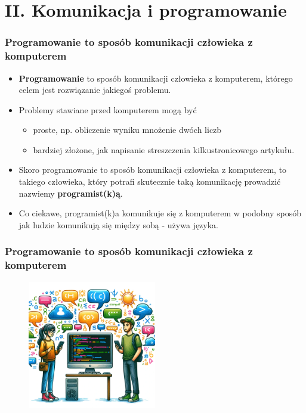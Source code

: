 \documentclass{beamer}
\begin{document}
\section{II. Komunikacja i programowanie}

\begin{frame}[fragile]
\frametitle{Programowanie to sposób komunikacji człowieka z komputerem}
 \begin{itemize}
\item \textbf{Programowanie} to sposób komunikacji człowieka z komputerem, którego celem jest rozwiązanie jakiegoś problemu.
\item Problemy stawiane przed komputerem mogą być 
	\begin{itemize}
	\item proste, np. obliczenie wyniku mnożenie dwóch liczb
	\item bardziej złożone, jak napisanie streszczenia kilkustronicowego artykułu.
	\end{itemize}
\item Skoro programowanie to sposób komunikacji człowieka z komputerem, to takiego człowieka, który potrafi skutecznie taką komunikację prowadzić nazwiemy \textbf{programist(k)ą}. 
\item Co ciekawe, programist(k)a komunikuje się z komputerem w podobny sposób jak ludzie komunikują się między sobą - używa języka. 
\end{itemize}
\end{frame}

\begin{frame}[fragile]
\frametitle{Programowanie to sposób komunikacji człowieka z komputerem}

                    \begin{figure}[h]
                        \centering
                        \includegraphics[width=0.5\textwidth]{../../img/komunikacja4.png}
                    \end{figure}                    

\end{frame}
\end{document}
